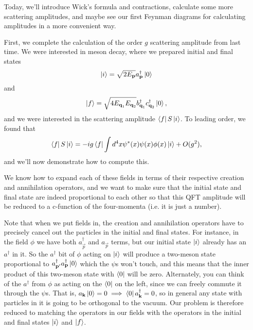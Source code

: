 Today, we'll introduce Wick's formula and contractions, calculate some more scattering amplitudes, and maybe see our first Feynman diagrams for calculating amplitudes in a more convenient way.

First, we complete the calculation of the order $g$ scattering amplitude from last time. We were interested in meson decay, where we prepared initial and final states
\begin{equation}
  \left| i \right>=\sqrt{2E_{\boldsymbol{\mathbf{p}}}}a_{\boldsymbol{\mathbf{p}}}^\dagger \left| 0 \right>  
\end{equation}
and
\begin{equation}
    \left| f \right>=\sqrt{4E_{\boldsymbol{\mathbf{q}}_1}E_{\boldsymbol{\mathbf{q}}_2}}b_{\boldsymbol{\mathbf{q}}_1}^\dagger c_{\boldsymbol{\mathbf{q}}_2}^\dagger \left| 0 \right>,
\end{equation}
and we were interested in the scattering amplitude $\left< f \right|S \left| i \right>$. To leading order, we found that
\begin{equation}
    \left< f \right|S\left| i \right>=-ig \left< f \right|\int d^4 x \psi^* (x) \psi(x) \phi(x) \left| i \right> + O(g^2),
\end{equation}
and we'll now demonstrate how to compute this.

We know how to expand each of these fields in terms of their respective creation and annihilation operators, and we want to make sure that the initial state and final state are indeed proportional to each other so that this QFT amplitude will be reduced to a c-function of the four-momenta (i.e. it is just a number). 

Note that when we put fields in, the creation and annihilation operators have to precisely cancel out the particles in the initial and final states. For instance, in the field $\phi$ we have both $a_{\vec p}^\dagger$ and $a_{\vec p}$ terms, but our initial state $\left| i \right>$ already has an $a^\dagger$ in it. So the $a^\dagger$ bit of $\phi$ acting on $\left| i \right>$ will produce a two-meson state proportional to $a_{\boldsymbol{\mathbf{p}}'}^\dagger a_{\boldsymbol{\mathbf{p}}}^\dagger \left| 0 \right>$ which the $\psi$s won't touch, and this means that the inner product of this two-meson state with $\left< 0 \right|$ will be zero. Alternately, you can think of the $a^\dagger$ from $\phi$ as acting on the $\left< 0 \right|$ on the left, since we can freely commute it through the $\psi$s. That is, $a_{\boldsymbol{\mathbf{k}}}\left| 0 \right>=0\implies \left< 0 \right| a_{\boldsymbol{\mathbf{k}}}^\dagger =0$, so in general any state with particles in it is going to be orthogonal to the vacuum. Our problem is therefore reduced to matching the operators in our fields with the operators in the initial and final states $\left| i \right>$ and $\left| f \right>$.


